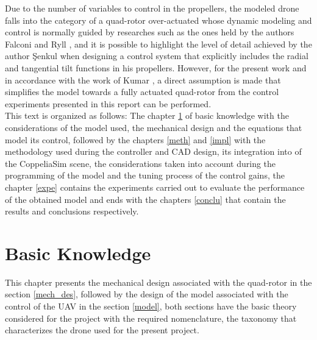 \documentclass[a4paper, 12pt, oneside]{book}
\begin{document}
Due to the number of variables to control in the propellers, the modeled drone falls into the category of a quad-rotor over-actuated whose dynamic modeling and control is normally guided by researches such as the ones held by the authors Falconi \cite{falconi2012dynamic} and Ryll \cite{ryll2013first}\cite{ryll2012modeling}, and it is possible to highlight the level of detail achieved by the author \c{S}enkul when designing a control system that explicitly includes the radial and tangential tilt functions in his propellers\cite{csenkul2016system}. However, for the present work and in accordance with the work of Kumar \cite{kumar2017position}, a direct assumption is made that simplifies the model towards a fully actuated quad-rotor from the control experiments presented in this report can be performed.\\

This text is organized as follows: The chapter \ref{bk} of basic knowledge with the considerations of the model used, the mechanical design and the equations that model its control, followed by the chapters \ref{meth} and \ref{impl} with the methodology used during the controller and CAD design, its integration into of the CoppeliaSim scene, the considerations taken into account during the programming of the model and the tuning process of the control gains, the chapter \ref{expe} contains the experiments carried out to evaluate the performance of the obtained model and ends with the chapters \ref{conclu} that contain the results and conclusions respectively.

\pagestyle{fancy}
\fancyhf{}
\renewcommand{\headrulewidth}{2pt}
\fancyhead[L]{\textbf{\textsf{\nouppercase\thepage}}}
\fancyhead[R]{\textbf{\textsf{\nouppercase\leftmark}}}
\fancyhead[OR]{\textbf{\textsf{\nouppercase\thepage}}}
\fancyhead[OL]{\textbf{\textsf{\nouppercase {\rightmark}}}}

\chapter{Basic Knowledge}\label{bk}

This chapter presents the mechanical design associated with the quad-rotor in the section \ref{mech_des}, followed by the design of the model associated with the control of the UAV in the section \ref{model}, both sections have the basic theory considered for the project with the required nomenclature, the taxonomy that characterizes the drone used for the present project.
\end{document}

